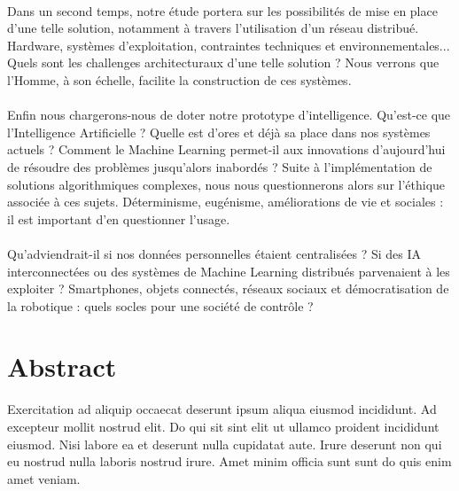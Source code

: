 \paragraph{} Dans un second temps, notre étude portera sur les possibilités de mise en place
d'une telle solution, notamment à travers l'utilisation d'un réseau distribué. Hardware,
systèmes d'exploitation, contraintes techniques et environnementales... Quels sont les challenges
architecturaux d'une telle solution ? Nous verrons que l'Homme, à son échelle, facilite la 
construction de ces systèmes.

\paragraph{} Enfin nous chargerons-nous de doter notre prototype d'intelligence. Qu'est-ce que
l'Intelligence Artificielle ? Quelle est d'ores et déjà sa place dans nos systèmes actuels ?
Comment le Machine Learning permet-il aux innovations d'aujourd'hui de résoudre des problèmes
jusqu'alors inabordés ? Suite à l'implémentation de solutions algorithmiques complexes,
nous nous questionnerons alors sur l'éthique associée à ces sujets. Déterminisme,
eugénisme, améliorations de vie et sociales : il est important d'en questionner l'usage.

\paragraph{}  Qu'adviendrait-il si nos données personnelles étaient centralisées ? Si des IA interconnectées
ou des systèmes de Machine Learning distribués parvenaient à les exploiter ? Smartphones,
objets connectés, réseaux sociaux et démocratisation de la robotique : quels socles pour une
société de contrôle ?



\newpage
\section*{Abstract}
Exercitation ad aliquip occaecat deserunt ipsum aliqua eiusmod incididunt. Ad excepteur mollit nostrud elit. Do qui sit sint elit ut ullamco proident incididunt eiusmod. Nisi labore ea et deserunt nulla cupidatat aute. Irure deserunt non qui eu nostrud nulla laboris nostrud irure. Amet minim officia sunt sunt do quis enim amet veniam.
